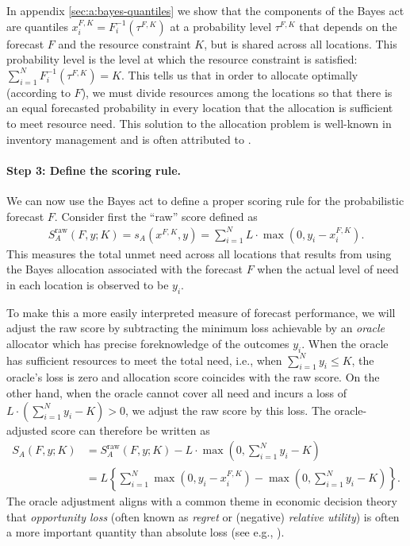 \documentclass{article}\usepackage[]{graphicx}\usepackage[]{xcolor}
\begin{document}
In appendix \ref{sec:a:bayes-quantiles} we show that the components of the Bayes act are quantiles 
$x_i^{F,K} = F_i^{-1}(\tau^{F,K})$ at a probability level $\tau^{F,K}$ that depends on the forecast $F$ and the resource
constraint $K$, but is shared across all locations. This probability level is the level at which the resource constraint
is satisfied: $\sum_{i=1}^N F_i^{-1}(\tau^{F,K}) = K$. This tells us that in order to allocate optimally (according to
$F$), we must divide resources among the locations so that there is an equal forecasted probability in every location
that the allocation is sufficient to meet resource need. This solution to the allocation problem is well-known in
inventory management and is often attributed to \cite{hadleywhitin1963}.

\paragraph{Step 3: Define the scoring rule.} We can now use the Bayes act to define a proper scoring rule for the
probabilistic forecast $F$. Consider first the ``raw'' score defined as
\begin{align}
  S_A^{\text{raw}}(F, y; K) = s_A(x^{F,K}, y) = \sum_{i=1}^N L \cdot \max(0, y_i - x_i^{F,K}).
\end{align}
This measures the total unmet need across all locations that results from using the Bayes allocation associated with the
forecast $F$ when the actual level of need in each location is observed to be $y_i$.

To make this a more easily interpreted measure of forecast performance, we will adjust the raw score by subtracting the
minimum loss achievable by an \emph{oracle} allocator which has precise foreknowledge of the outcomes $y_i$. When the
oracle has sufficient resources to meet the total need, i.e., when $\sum_{i=1}^{N}y_i \leq K$, the oracle's loss is zero
and allocation score coincides with the raw score. On the other hand, when the oracle cannot cover all need and incurs a
loss of $L \cdot \left(\sum_{i=1}^{N}y_i - K \right) > 0$, we adjust the raw score by this loss.
The oracle-adjusted score can therefore be written as
\begin{align}
  S_A(F, y; K)  &= S_A^{\text{raw}}(F, y; K) - L \cdot \max\left(0,\sum_{i=1}^{N}y_i - K\right) \\
  &= L\left\{\sum_{i=1}^N \max(0, y_i - x_i^{F,K}) -  \max\left(0,\sum_{i=1}^{N}y_i - K\right)\right\}.
\end{align}
The oracle adjustment aligns with a common theme in economic decision theory that \emph{opportunity loss} (often known
as \emph{regret} or (negative) \emph{relative utility}) is often a more important quantity than absolute loss (see e.g.,
\cite{DIECIDUE201788}).
\end{document}
